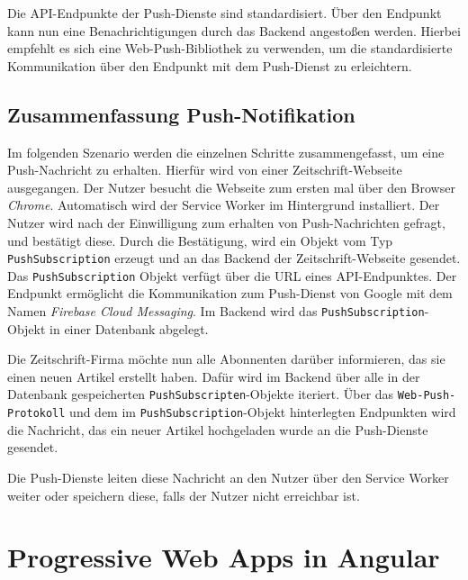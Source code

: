 Die API-Endpunkte der Push-Dienste sind standardisiert. Über den Endpunkt kann nun eine Benachrichtigungen durch das Backend angestoßen werden. Hierbei empfehlt es sich eine Web-Push-Bibliothek zu verwenden, um die standardisierte Kommunikation über den Endpunkt mit dem Push-Dienst zu erleichtern. 

\subsection{Zusammenfassung Push-Notifikation}

Im folgenden Szenario werden die einzelnen Schritte zusammengefasst, um eine Push-Nachricht zu erhalten. Hierfür wird von einer Zeitschrift-Webseite ausgegangen. Der Nutzer besucht die Webseite zum ersten mal über den Browser \textit{Chrome}. Automatisch wird der Service Worker im Hintergrund installiert. Der Nutzer wird nach der Einwilligung zum erhalten von Push-Nachrichten gefragt, und bestätigt diese. Durch die Bestätigung, wird ein Objekt vom Typ \texttt{PushSubscription} erzeugt und an das Backend der Zeitschrift-Webseite gesendet. Das \texttt{PushSubscription} Objekt verfügt über die URL eines API-Endpunktes. Der Endpunkt ermöglicht die Kommunikation zum Push-Dienst von Google mit dem Namen \textit{Firebase Cloud Messaging}. 
Im Backend wird das \texttt{PushSubscription}-Objekt in einer Datenbank abgelegt. 

Die Zeitschrift-Firma möchte nun alle Abonnenten darüber informieren, das sie einen neuen Artikel erstellt haben. Dafür wird im Backend über alle in der Datenbank gespeicherten \texttt{PushSubscripten}-Objekte iteriert. Über das \texttt{Web-Push-Protokoll} und dem im \texttt{PushSubscription}-Objekt hinterlegten Endpunkten wird die Nachricht, das ein neuer Artikel hochgeladen wurde an die Push-Dienste gesendet. 

Die Push-Dienste leiten diese Nachricht an den Nutzer über den Service Worker weiter oder speichern diese, falls der Nutzer nicht erreichbar ist. 


\section{Progressive Web Apps in Angular}\label{sec:pwaAngular}

